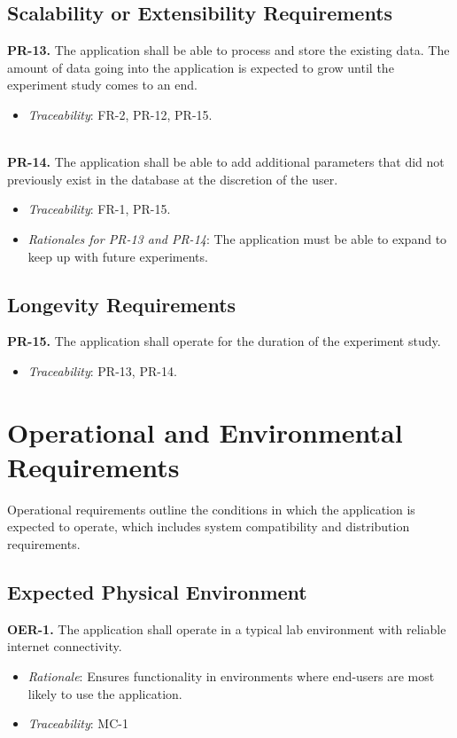 \documentclass[12pt]{article}
\begin{document}
\subsection{Scalability or Extensibility Requirements}
\textbf{PR-13.} The application shall be able to process and store the existing data. The amount of data going into the application is expected to grow until the experiment study comes to an end.
    \begin{itemize}
      \item \textit{Traceability}: FR-2, PR-12, PR-15.
    \end{itemize}
\ \\
\textbf{PR-14.} The application shall be able to add additional parameters that did not previously exist in the database at the discretion of the user.
    \begin{itemize}
      \item \textit{Traceability}: FR-1, PR-15.
    \end{itemize}

\begin{itemize}
  \item \textit{Rationales for PR-13 and PR-14}: The application must be able to expand to keep up with future experiments.
\end{itemize}

\subsection{Longevity Requirements}
\textbf{PR-15.} The application shall operate for the duration of the experiment study.
  \begin{itemize}
    \item \textit{Traceability}: PR-13, PR-14.
  \end{itemize}


\section{Operational and Environmental Requirements}
Operational requirements outline the conditions in which the application is expected to operate, which includes system compatibility and distribution requirements.
\subsection{Expected Physical Environment}
\textbf{OER-1.} The application shall operate in a typical lab environment with reliable internet connectivity.
    \begin{itemize}
      \item \textit{Rationale}: Ensures functionality in environments where end-users are most likely to use the application. 
      \item \textit{Traceability}: MC-1
    \end{itemize}
\end{document}
